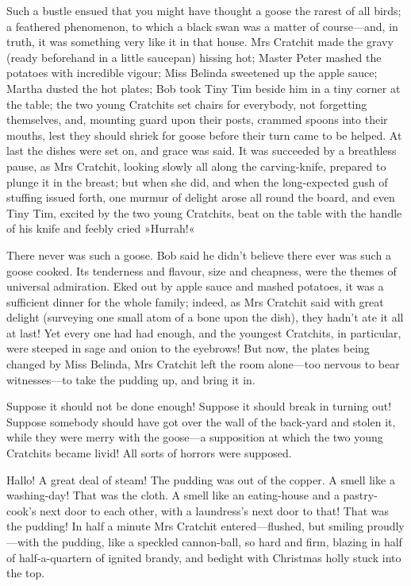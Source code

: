 Such a bustle ensued that you might have thought a goose the rarest of all birds; a feathered phenomenon, to which a black swan was a matter of course—and, in truth, it was something very like it in that house. Mrs Cratchit made the gravy (ready beforehand in a little saucepan) hissing hot; Master Peter mashed the potatoes with incredible vigour; Miss Belinda sweetened up the apple sauce; Martha dusted the hot plates; Bob took Tiny Tim beside him in a tiny corner at the table; the two young Cratchits set chairs for everybody, not forgetting themselves, and, mounting guard upon their posts, crammed spoons into their mouths, lest they should shriek for goose before their turn came to be helped. At last the dishes were set on, and grace was said. It was succeeded by a breathless pause, as Mrs Cratchit, looking slowly all along the carving-knife, prepared to plunge it in the breast; but when she did, and when the long-expected gush of stuffing issued forth, one murmur of delight arose all round the board, and even Tiny Tim, excited by the two young Cratchits, beat on the table with the handle of his knife and feebly cried »Hurrah!«



There never was such a goose. Bob said he didn't believe there ever was such a goose cooked. Its tenderness and flavour, size and cheapness, were the themes of universal admiration. Eked out by apple sauce and mashed potatoes, it was a sufficient dinner for the whole family; indeed, as Mrs Cratchit said with great delight (surveying one small atom of a bone upon the dish), they hadn't ate it all at last! Yet every one had had enough, and the youngest Cratchits, in particular, were steeped in sage and onion to the eyebrows! But now, the plates being changed by Miss Belinda, Mrs Cratchit left the room alone—too nervous to bear witnesses—to take the pudding up, and bring it in.



Suppose it should not be done enough! Suppose it should break in turning out! Suppose somebody should have got over the wall of the back-yard and stolen it, while they were merry with the goose—a supposition at which the two young Cratchits became livid! All sorts of horrors were supposed.

Hallo! A great deal of steam! The pudding was out of the copper. A smell like a washing-day! That was the cloth. A smell like an eating-house and a pastry-cook's next door to each other, with a laundress's next door to that! That was the pudding! In half a minute Mrs Cratchit entered—flushed, but smiling proudly—with the pudding, like a speckled cannon-ball, so hard and firm, blazing in half of half-a-quartern of ignited brandy, and bedight with Christmas holly stuck into the top.

